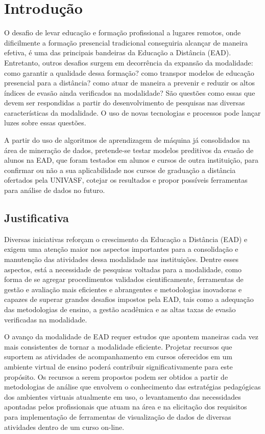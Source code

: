 \chapter{Introdução}

O desafio de levar educação e formação profissional a lugares remotos, onde
dificilmente a formação presencial tradicional conseguiria alcançar de maneira
efetiva, é uma das principais bandeiras da Educação a Distância (EAD).
Entretanto, outros desafios surgem em decorrência da expansão da modalidade:
como garantir a qualidade dessa formação? como transpor modelos de educação
presencial para a distância? como atuar de maneira a prevenir e reduzir os altos
índices de evasão ainda verificados na modalidade? São questões como essas que
devem ser respondidas a partir do desenvolvimento de pesquisas nas diversas
características da modalidade. O uso de novas tecnologias e processos pode
lançar luzes sobre essas questões.

A partir do uso de algoritmos de aprendizagem de máquina já consolidados na área
de mineração de dados, pretende-se testar modelos preditivos da evasão de alunos
na EAD, que foram testados em alunos e cursos de outra instituição, para
confirmar ou não a sua aplicabilidade nos cursos de graduação a distância
ofertados pela UNIVASF, cotejar os resultados e propor possíveis ferramentas
para análise de dados no futuro.

\section{Justificativa}

Diversas iniciativas reforçam o crescimento da Educação a Distância (EAD) e
exigem uma atenção maior nos aspectos importantes para a consolidação e
manutenção das atividades dessa modalidade nas instituições. Dentre esses
aspectos, está a necessidade de pesquisas voltadas para a modalidade, como forma
de se agregar procedimentos validados cientificamente, ferramentas de gestão e
avaliação mais eficientes e abrangentes e metodologias inovadoras e capazes de
superar grandes desafios impostos pela EAD, tais como a adequação das
metodologias de ensino, a gestão acadêmica e as altas taxas de evasão
verificadas na modalidade.

O avanço da modalidade de EAD requer estudos que apontem maneiras cada vez mais
consistentes de tornar a modalidade eficiente. Projetar recursos que suportem as
atividades de acompanhamento em cursos oferecidos em um ambiente virtual de
ensino poderá contribuir significativamente para este propósito. Os recursos a
serem propostos podem ser obtidos a partir de metodologias de análise que
envolvem o conhecimento das estratégias pedagógicas dos ambientes virtuais
atualmente em uso, o levantamento das necessidades apontadas pelos profissionais
que atuam na área e na elicitação dos requisitos para implementação de
ferramentas de visualização de dados de diversas atividades dentro de um curso
on-line. \cite{ramos2016abordagem}

